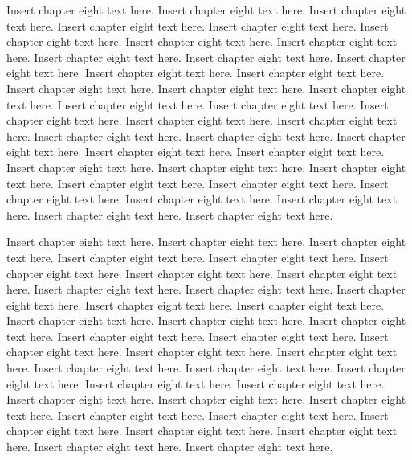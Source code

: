 Insert chapter eight text here. Insert chapter eight text here. Insert chapter eight text here. Insert chapter eight text here. Insert chapter eight text here. Insert chapter eight text here. Insert chapter eight text here. Insert chapter eight text here. Insert chapter eight text here. Insert chapter eight text here. Insert chapter eight text here. Insert chapter eight text here. Insert chapter eight text here. Insert chapter eight text here. Insert chapter eight text here. Insert chapter eight text here. Insert chapter eight text here. Insert chapter eight text here. Insert chapter eight text here. Insert chapter eight text here. Insert chapter eight text here. Insert chapter eight text here. Insert chapter eight text here. Insert chapter eight text here. Insert chapter eight text here. Insert chapter eight text here. Insert chapter eight text here. Insert chapter eight text here. Insert chapter eight text here. Insert chapter eight text here. Insert chapter eight text here. Insert chapter eight text here. Insert chapter eight text here. Insert chapter eight text here. Insert chapter eight text here. Insert chapter eight text here.

Insert chapter eight text here. Insert chapter eight text here. Insert chapter eight text here. Insert chapter eight text here. Insert chapter eight text here. Insert chapter eight text here. Insert chapter eight text here. Insert chapter eight text here. Insert chapter eight text here. Insert chapter eight text here. Insert chapter eight text here. Insert chapter eight text here. Insert chapter eight text here. Insert chapter eight text here. Insert chapter eight text here. Insert chapter eight text here. Insert chapter eight text here. Insert chapter eight text here. Insert chapter eight text here. Insert chapter eight text here. Insert chapter eight text here. Insert chapter eight text here. Insert chapter eight text here. Insert chapter eight text here. Insert chapter eight text here. Insert chapter eight text here. Insert chapter eight text here. Insert chapter eight text here. Insert chapter eight text here. Insert chapter eight text here. Insert chapter eight text here. Insert chapter eight text here. Insert chapter eight text here. Insert chapter eight text here. Insert chapter eight text here. Insert chapter eight text here.

